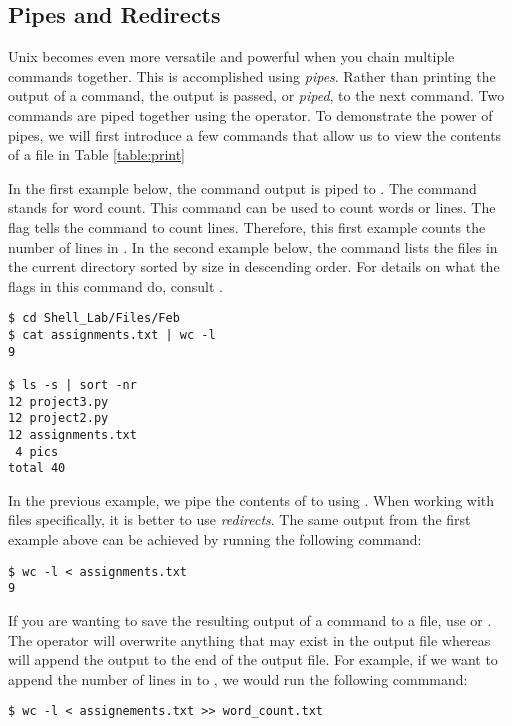 \subsection*{Pipes and Redirects}
Unix becomes even more versatile and powerful when you chain multiple commands together. This is accomplished using \emph{pipes}. Rather than printing the output of a command, the output is passed, or \emph{piped}, to the next command. Two commands are piped together using the \li{|} operator. To demonstrate the power of pipes, we will first introduce a few commands that allow us to view the contents of a file in Table \ref{table:print}

In the first example below, the  command output is piped to . The  command stands for word count. This command can be used to count words or lines. The  flag tells the  command to count lines. Therefore, this first example counts the number of lines in . 
In the second example below, the command lists the files in the current directory sorted by size in descending order. For details on what the flags in this command do, consult .

\begin{lstlisting}
$ cd Shell_Lab/Files/Feb
$ cat assignments.txt | wc -l
9

$ ls -s | sort -nr
12 project3.py
12 project2.py
12 assignments.txt
 4 pics
total 40
\end{lstlisting}

In the previous example, we pipe the contents of  to  using .
When working with files specifically, it is better to use \emph{redirects}.
The same output from the first example above can be achieved by running the following command:

\begin{lstlisting}
$ wc -l < assignments.txt
9
\end{lstlisting}

If you are wanting to save the resulting output of a command to a file, use \li{>} or \li{>>}.
The \li{>} operator will overwrite anything that may exist in the output file whereas \li{>>} will append the output to the end of the output file.
For example, if we want to append the number of lines in  to , we would run the following commmand:

\begin{lstlisting}
$ wc -l < assignements.txt >> word_count.txt
\end{lstlisting}

